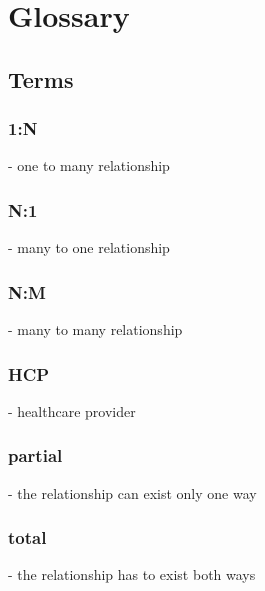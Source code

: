 \chapter{Glossary}

\section{Terms}
\subsection{1:N}- one to many relationship
\subsection{N:1}- many to one relationship
\subsection{N:M}- many to many relationship
\subsection{HCP}- healthcare provider
\subsection{partial}- the relationship can exist only one way
\subsection{total}- the relationship has to exist both ways